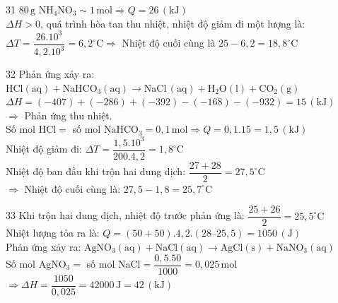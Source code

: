 \def\writeANS{}
\begin{loigiaibth}{31}
  $80\,\mathrm {g}$ $\mathrm {NH_4NO_3} \sim 1\,\mathrm {mol} \Rightarrow Q = 26\,\mathrm {(kJ)}$ \\ $\Delta H > 0$, quá trình hòa tan thu nhiệt, nhiệt độ giảm đi một lượng là: \\ $\Delta T = \dfrac {26.10^3}{4{,}2.10^3} = 6{,}2^\circ \mathrm {C} \Rightarrow $ Nhiệt độ cuối cùng là $25 - 6{,}2 = 18{,}8^\circ \mathrm {C}$
\end{loigiaibth}
\def\writeANS{}
\begin{loigiaibth}{32}
  Phản ứng xảy ra: $\mathrm {HCl(aq) + NaHCO_3(aq) \longrightarrow NaCl\,(aq) + H_2O(l) + CO_2(g)}$ \\ $\Delta H = (-407) + (-286) + (-392) - (-168) - (-932) = 15\,\mathrm {(kJ)}$ \\ $\Rightarrow $ Phản ứng thu nhiệt. \\ Số mol $\mathrm {HCl} =$ số mol $\mathrm {NaHCO_3} = 0{,}1\,\mathrm {mol} \Rightarrow Q = 0{,}1.15 = 1{,}5\,\mathrm {(kJ)}$ \\ Nhiệt độ giảm đi: $\Delta T = \dfrac {1{,}5.10^3}{200.4{,}2} = 1{,}8^\circ \mathrm {C}$ \\ Nhiệt độ ban đầu khi trộn hai dung dịch: $\dfrac {27 + 28}{2} = 27{,}5^\circ \mathrm {C}$ \\ $\Rightarrow $ Nhiệt độ cuối cùng là: $27{,}5 - 1{,}8 = 25{,}7^\circ \mathrm {C}$
\end{loigiaibth}
\def\writeANS{}
\begin{loigiaibth}{33}
  Khi trộn hai dung dịch, nhiệt độ trước phản ứng là: $\dfrac {25+26}{2} = 25{,}5^\circ \mathrm {C}$ \\ Nhiệt lượng tỏa ra là: $Q = (50 + 50).4{,}2.(28 – 25{,}5) = 1050\,\mathrm {(J)}$ \\ Phản ứng xảy ra: $\mathrm {AgNO_3(aq) + NaCl(aq) \longrightarrow AgCl(s) + NaNO_3(aq)}$ \\ Số mol $\mathrm {AgNO_3} =$ số mol $\mathrm {NaCl} = \dfrac {0{,}5.50}{1000} = 0{,}025\,\mathrm {mol}$ \\ $\Rightarrow \Delta H = \dfrac {1050}{0{,}025} = 42000\,\mathrm {J} = 42\,\mathrm {(kJ)}$
\end{loigiaibth}
